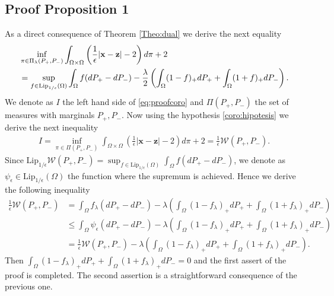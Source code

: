 \subsection{Proof Proposition 1}
As a direct consequence of Theorem \ref{Theo:dual} we derive the next equality 
 \begin{align}\label{eq:proofcoro}
\begin{split}
	&\inf_{\pi \in\Pi_{\lambda}(P_+, P_-)}\int_{\Omega\times \Omega}\left(\frac{1}{\epsilon}| {\textbf{x}}-{\textbf{{{\textbf{z}}}}} |-2\right)d\pi  +2\\&= \sup_{f\in \text{Lip}_{1/\epsilon}(\Omega)}\int_{\Omega}f(dP_+-dP_-)-\frac{\lambda}{2} \left( \int_{\Omega}(1-f)_+dP_+ +\int_{\Omega}(1+f)_+dP_-\right).
	\end{split}
\end{align}
We denote as $I$ the left hand side of \eqref{eq:proofcoro} and $\Pi(P_+, P_-)$ the set of measures with marginals $P_+, P_-$. Now using the hypothesis \eqref{coro:hipotesis} we derive the next inequality  
\begin{align*}
	I=\inf_{\pi \in\Pi(P_+, P_-)}\int_{\Omega\times \Omega}\left(\frac{1}{\epsilon}|{\textbf{x}}-{{\textbf{z}}} |-2\right)d\pi+2= \frac{1}{\epsilon}\mathcal{W}(P_+, P_-).
\end{align*}
Since { $\text{Lip}_{1/\epsilon}\mathcal{W}(P_+, P_-)=\sup_{f\in \text{Lip}_{1/\epsilon}(\Omega)}\int_{\Omega}f(dP_+-dP_-)$}, we denote as $\psi_{\epsilon}\in \text{Lip}_{1/\epsilon}(\Omega)$ the function where the supremum is achieved. Hence we derive the following inequality
\begin{align*}
  \frac{1}{\epsilon}\mathcal{W}(P_+, P_-)&= \int_{\Omega}f_{\lambda}(dP_+-dP_-)-\lambda \left( \int_{\Omega}(1-f_{\lambda})_+dP_+ +\int_{\Omega}(1+f_{\lambda})_+dP_-\right)\\
	&\leq \int_{\Omega}\psi_{\epsilon} (dP_+-dP_-)-\lambda \left( \int_{\Omega}(1-f_{\lambda})_+dP_+ +\int_{\Omega}(1+f_{\lambda})_+dP_-\right)\\
	&=\frac{1}{\epsilon}\mathcal{W}(P_+, P_-) -\lambda \left( \int_{\Omega}(1-f_{\lambda})_+dP_+ +\int_{\Omega}(1+f_{\lambda})_+dP_-\right).
\end{align*}
Then $ \int_{\Omega}(1-f_{\lambda})_+dP_+ +\int_{\Omega}(1+f_{\lambda})_+dP_-=0$ and the first assert of the proof is completed. The second assertion   is a straightforward consequence of the previous one.

